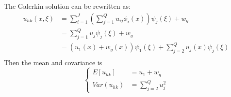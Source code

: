 \begin{theorem}
    The Galerkin solution can be rewritten as:
    \begin{equation}
        \begin{aligned}
            u_{hk}(x, \xi) &=\sum_{i=1}^{J}\left(\sum_{j=1}^{Q}u_{ij}\phi_i(x)\right)\psi_j(\xi)+w_g\\
            &=\sum_{j=1}^{Q}u_j\psi_j(\xi)+w_g\\
            &= (u_1(x)+w_g(x))\psi_1(\xi) + \sum_{j=2}^{Q}u_j(x)\psi_j(\xi)\\
        \end{aligned}
    \end{equation}
    Then the mean and covariance is 
    \begin{equation}\left\{
        \begin{aligned}
            E[u_{hk}] &= u_1+w_g\\
            Var(u_{hk}) &= \sum_{j=2}^{Q}u_j^2
        \end{aligned}\right.
    \end{equation}
\end{theorem}
